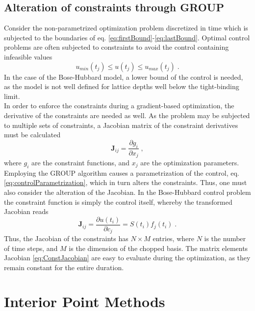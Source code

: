 \subsection{Alteration of constraints through GROUP}
Consider the non-parametrized optimization problem discretized in time which is subjected to the boundaries of eq. \eqref{eq:firstBound}-\eqref{eq:lastBound}. Optimal control problems are often subjected to constraints to avoid the control containing infeasible values
\begin{equation}
	 u_{min} (t_j) \leq u(t_j) \leq u_{max} (t_j) \; .
\end{equation}
In the case of the Bose-Hubbard model, a lower bound of the control is needed, as the model is not well defined for lattice depths well below the tight-binding limit.\\
In order to enforce the constraints during a gradient-based optimization, the derivative of the constraints are needed as well. As the problem may be subjected to multiple sets of constraints, a Jacobian matrix of the constraint derivatives must be calculated
\begin{equation}
	\boldsymbol{J}_{ij} = \frac{\partial g_i}{\partial x_j} \; ,
\end{equation}
where $g_i$ are the constraint functions, and $x_j$ are the optimization parameters.\\
Employing the GROUP algorithm causes a parametrization of the control, eq. \eqref{eq:controlParametrization}, which in turn alters the constraints. Thus, one must also consider the alteration of the Jacobian. In the Bose-Hubbard control problem the constraint function is simply the control itself, whereby the transformed Jacobian reads
\begin{equation}
	\boldsymbol{J}_{ij} = \frac{\partial u(t_i)}{\partial c_j} = S(t_i) f_j (t_i) \; . \label{eq:ConstJacobian}
\end{equation}
Thus, the Jacobian of the constraints has $N \times M$ entries, where $N$ is the number of time steps, and $M$ is the dimension of the chopped basis. The matrix elements Jacobian \ref{eq:ConstJacobian} are easy to evaluate during the optimization, as they remain constant for the entire duration.


\section{Interior Point Methods} \label{sec:IntPoint}

